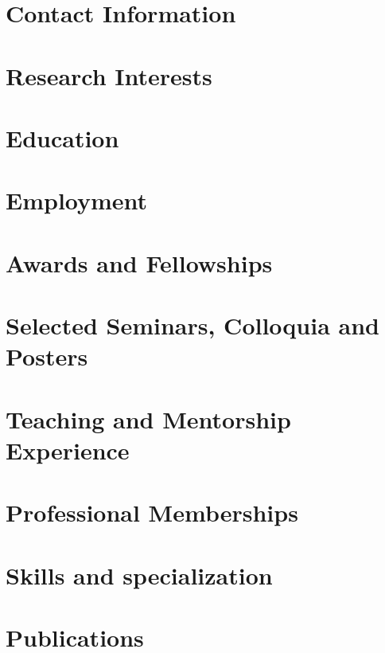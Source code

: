 \documentclass[margin,line]{res}
\begin{document}
\centerline{\LARGE {}}
\bigskip

\begin{resume}
\section{\sc Contact Information}
    
\section{\sc Research Interests}
    
\section{\sc Education}
    
\section{\sc Employment}
    
\section{\sc Awards and Fellowships}
    
\section{\sc Selected Seminars, Colloquia and Posters}
    
\section{\sc Teaching and Mentorship Experience}
    
\section{\sc Professional Memberships}
    
\section{\sc Skills and specialization}
    
\end{resume}
\clearpage
\section{\sc Publications}
    
\end{document}
